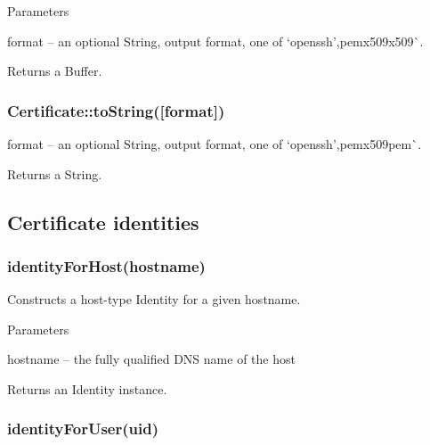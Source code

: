 Parameters


\begin{DoxyItemize}
\item {\ttfamily format} -- an optional String, output format, one of `\textquotesingle{}openssh'{\ttfamily ,}\textquotesingle{}pem\textquotesingle{}x509\textquotesingle{}x509\textquotesingle{}\`{}.
\end{DoxyItemize}

Returns a Buffer.

\subsubsection*{{\ttfamily Certificate\+::to\+String(\mbox{[}format\mbox{]})}}


\begin{DoxyItemize}
\item {\ttfamily format} -- an optional String, output format, one of `\textquotesingle{}openssh'{\ttfamily ,}\textquotesingle{}pem\textquotesingle{}x509\textquotesingle{}pem\textquotesingle{}\`{}.
\end{DoxyItemize}

Returns a String.

\subsection*{Certificate identities}

\subsubsection*{{\ttfamily identity\+For\+Host(hostname)}}

Constructs a host-\/type Identity for a given hostname.

Parameters


\begin{DoxyItemize}
\item {\ttfamily hostname} -- the fully qualified D\+NS name of the host
\end{DoxyItemize}

Returns an Identity instance.

\subsubsection*{{\ttfamily identity\+For\+User(uid)}}

